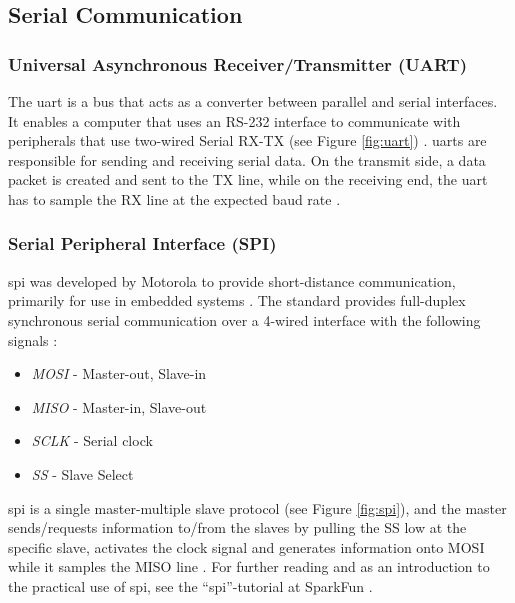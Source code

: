\subsection{Serial Communication}
\subsubsection{Universal Asynchronous Receiver/Transmitter (UART)}
\label{sec:uart}
The \acrfull{uart} is a bus that acts as a converter between parallel and serial interfaces. It enables a computer that uses an RS-232 interface to communicate with peripherals that use two-wired Serial RX-TX (see Figure \ref{fig:uart}) \cite{whatisuart}.
\acrshort{uart}s are responsible for sending and receiving serial data. On the transmit side, a data packet is created and sent to the TX line, while on the receiving end, the \acrshort{uart} has to sample the RX line at the expected baud rate \cite{sparkfunuart}.

\subsubsection{Serial Peripheral Interface (SPI)}
\label{sec:spi}
\acrfull{spi} was developed by Motorola to provide short-distance communication, primarily for use in embedded systems \cite{corelis2016}. The standard provides full-duplex synchronous serial communication over a 4-wired interface with the following signals \cite{epanorama2011}:
\begin{itemize}
    \item \textit{MOSI} - Master-out, Slave-in
    \item \textit{MISO} - Master-in, Slave-out
    \item \textit{SCLK} - Serial clock
    \item \textit{SS} - Slave Select
\end{itemize}
\acrshort{spi} is a single master-multiple slave protocol (see Figure \ref{fig:spi}), and the master sends/requests information to/from the slaves by pulling the SS low at the specific slave, activates the clock signal and generates information onto MOSI while it samples the MISO line \cite{byteparadigm}. For further reading and as an introduction to the practical use of \acrshort{spi}, see the ``\acrfull{spi}''-tutorial at SparkFun \cite{sparkfunspi}.
